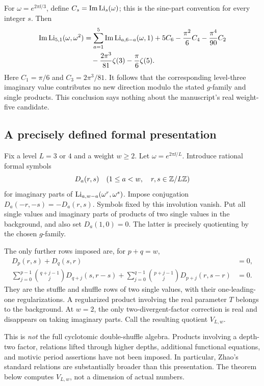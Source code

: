 For \(\omega=e^{2\pi\ii/3}\), define
\(C_s=\operatorname{Im}\operatorname{Li}_s(\omega)\); this is the sine-part convention for every
integer \(s\). Then
\begin{align}
 \operatorname{Im}\operatorname{Li}_{5,1}(\omega,\omega^2)
 &=\sum_{a=1}^{5}\operatorname{Im}\operatorname{Li}_{a,6-a}(\omega,1)
     +5C_6-\frac{\pi^2}{6}C_4-\frac{\pi^4}{90}C_2\notag\\
 &\quad-\frac{2\pi^3}{81}\zeta(3)-\frac{\pi}{6}\zeta(5).
 \label{eq:eisenstein-weight-six}
\end{align}
Here \(C_1=\pi/6\) and \(C_3=2\pi^3/81\).
It follows that the corresponding level-three imaginary value
contributes no new direction modulo the stated \(g\)-family and
single products. This conclusion says nothing about the manuscript's
real weight-five candidate.

\subsection{A precisely defined formal presentation}

Fix a level \(L=3\) or \(4\) and a weight \(w\geq2\). Let
\(\omega=e^{2\pi\ii/L}\).
Introduce rational formal symbols
\[
 D_a(r,s)\quad(1\leq a<w,\quad r,s\in\mathbb Z/L\mathbb Z)
\]
for imaginary parts of \(\operatorname{Li}_{a,w-a}(\omega^r,\omega^s)\).
Impose conjugation \(D_a(-r,-s)=-D_a(r,s)\).
Symbols fixed by this involution vanish. Put all single values and
imaginary parts of products of two single values in the background,
and also set \(D_a(1,0)=0\). The latter is precisely quotienting by
the chosen \(g\)-family.

The only further rows imposed are, for \(p+q=w\),
\begin{align}
 D_p(r,s)+D_q(s,r)&=0,\label{eq:formal-stuffle}\\
 \sum_{j=0}^{p-1}\binom{q+j-1}{j}D_{q+j}(s,r-s)
 +\sum_{j=0}^{q-1}\binom{p+j-1}{j}D_{p+j}(r,s-r)&=0.
 \label{eq:formal-shuffle}
\end{align}
They are the stuffle and shuffle rows of two single values, with their
one-leading-one regularizations. A regularized product involving the
real parameter \(T\) belongs to the background. At \(w=2\), the only
two-divergent-factor correction is real and disappears on taking
imaginary parts. Call the resulting quotient \(V_{L,w}\).

This is \emph{not} the full cyclotomic double-shuffle algebra. Products
involving a depth-two factor, relations lifted through higher depths,
additional functional equations, and motivic period assertions have
not been imposed. In particular, Zhao's standard relations
\cite{Zhao} are substantially broader than this presentation.
The theorem below computes \(V_{L,w}\), not a dimension of actual
numbers.

